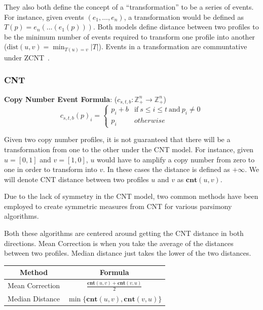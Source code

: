 They also both define the concept of a ``transformation'' to be a series of events. For instance, given events $(e_1, \hdots, e_n)$, a transformation would be defined as $T(p) = e_n(\hdots(e_1(p)))$. Both models define distance between two profiles to be the minimum number of events required to transform one profile into another ($\text{dist}(u, v) = \min_{T(u) = v} |T|$). Events in a transformation are communtative under ZCNT~\cite{zcnt_paper}.

\subsubsection{CNT}

\newcommand{\cnt}{\textbf{cnt}}
\newcommand{\zcnt}{\textbf{zcnt}}

{\bf Copy Number Event Formula}: ($c_{s, t, b}: \mathbb{Z}_+^n \rightarrow \mathbb{Z}_+^n$) 
\begin{equation}
    c_{s, t, b}{(p)}_i = \begin{cases}
        p_i + b & \text{if}~s \leq i \leq t~\text{and}~p_i \neq 0 \\ 
        p_i & otherwise
    \end{cases}
\end{equation}

Given two copy number profiles, it is not guaranteed that there will be a transformation from one to the other under the CNT model. For instance, given $u=[0,1]$ and $v=[1,0]$, $u$ would have to amplify a copy number from zero to one in order to transform into $v$. In these cases the distance is defined as $+\infty$. We will denote CNT distance between two profiles $u$ and $v$ as $\cnt(u, v)$.

Due to the lack of symmetry in the CNT model, two common methods have been employed to create symmetric measures from CNT for various parsimony algorithms.\vspace{5pt}

Both these algorithms are centered around getting the CNT distance in both directions. Mean Correction is when you take the average of the distances between two profiles. Median distance just takes the lower of the two distances.

\def\arraystretch{2}

\vspace{10pt}

\begin{tabular}{|c|c|}
    \hline
    {\bf Method} & {\bf Formula} \\  \hline \hline
    Mean Correction & $\frac{\cnt (u, v) + \cnt (v, u)}{2}$ \\ \hline
    Median Distance & $\min \{\cnt (u, v), \cnt (v, u)\}$ \\ \hline
\end{tabular}

